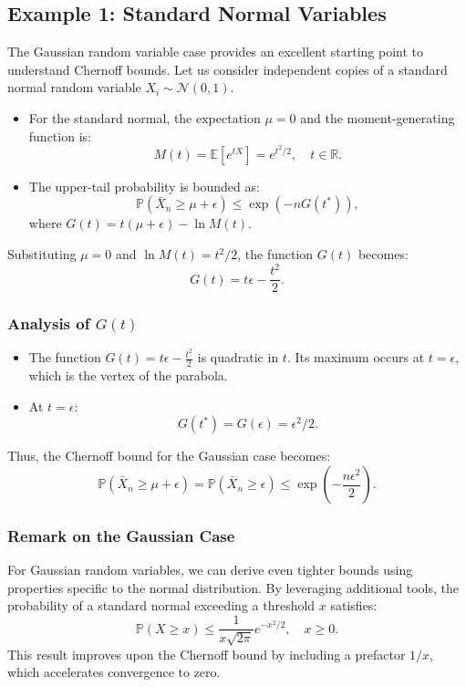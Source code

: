 \subsection{Example 1: Standard Normal Variables}
The Gaussian random variable case provides an excellent starting point to understand Chernoff bounds. Let us consider independent copies of a standard normal random variable \( X_i \sim \mathcal{N}(0, 1) \).
\begin{itemize}
    \item For the standard normal, the expectation \( \mu = 0 \) and the moment-generating function is:
    \[
    M(t) = \mathbb{E}[e^{t X}] = e^{t^2 / 2}, \quad t \in \mathbb{R}.
    \]
    \item The upper-tail probability is bounded as:
    \[
    \mathbb{P}(\bar{X}_n \geq \mu + \epsilon) \leq \exp\left(-n G(t^*)\right),
    \]
    where \( G(t) = t (\mu + \epsilon) - \ln M(t) \).
\end{itemize}
Substituting \( \mu = 0 \) and \( \ln M(t) = t^2 / 2 \), the function \( G(t) \) becomes:
\[
G(t) = t \epsilon - \frac{t^2}{2}.
\]

\subsubsection{Analysis of \( G(t) \)}
\begin{itemize}
    \item The function \( G(t) = t \epsilon - \frac{t^2}{2} \) is quadratic in \( t \). Its maximum occurs at \( t = \epsilon \), which is the vertex of the parabola.
    \item At \( t = \epsilon \):
    \[
    G(t^*) = G(\epsilon) = \epsilon^2 / 2.
    \]
\end{itemize}
Thus, the Chernoff bound for the Gaussian case becomes:
\[
\mathbb{P}(\bar{X}_n \geq \mu + \epsilon) = \mathbb{P}(\bar{X}_n \geq \epsilon) \leq \exp\left(-\frac{n \epsilon^2}{2}\right).
\]

\subsubsection{Remark on the Gaussian Case}
For Gaussian random variables, we can derive even tighter bounds using properties specific to the normal distribution. By leveraging additional tools, the probability of a standard normal exceeding a threshold \( x \) satisfies:
\[
\mathbb{P}(X \geq x) \leq \frac{1}{x \sqrt{2\pi}} e^{-x^2 / 2}, \quad x \geq 0.
\]
This result improves upon the Chernoff bound by including a prefactor \( 1/x \), which accelerates convergence to zero.

